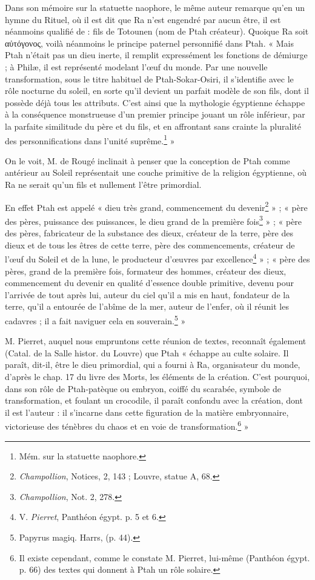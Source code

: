 \documentclass[letterpaper,twocolumn,openany,nodeprecatedcode]{dndbook}
\begin{document}
Dans son mémoire sur la statuette naophore, le même auteur remarque qu'en un hymne du Rituel, où il est dit que Ra n'est engendré par aucun être, il est néanmoins qualifié de : fils de Totounen (nom de Ptah créateur). Quoique Ra soit αὐτόγονος, voilà néanmoins le principe paternel personnifié dans Ptah. « Mais Ptah n'était pas un dieu inerte, il remplit expressément les fonctions de démiurge ; à Philæ, il est représenté modelant l'œuf du monde. Par une nouvelle transformation, sous le titre habituel de Ptah-Sokar-Osiri, il s'identifie avec le rôle nocturne du soleil, en sorte qu'il devient un parfait modèle de son fils, dont il possède déjà tous les attributs. C'est ainsi que la mythologie égyptienne échappe à la conséquence monstrueuse d'un premier principe jouant un rôle inférieur, par la parfaite similitude du père et du fils, et en affrontant sans crainte la pluralité des personnifications dans l'unité suprême.\footnote{Mém. sur la statuette naophore.} »

On le voit, M. de Rougé inclinait à penser que la conception de Ptah comme antérieur au Soleil représentait une couche primitive de la religion égyptienne, où Ra ne serait qu'un fils et nullement l'être primordial.

En effet Ptah est appelé « dieu très grand, commencement du devenir\footnote{\emph{Champollion}, Notices, 2, 143 ; Louvre, statue A, 68.} » ; « père des pères, puissance des puissances, le dieu grand de la première fois\footnote{\emph{Champollion}, Not. 2, 278.} » ; « père des pères, fabricateur de la substance des dieux, créateur de la terre, père des dieux et de tous les êtres de cette terre, père des commencements, créateur de l'œuf du Soleil et de la lune, le producteur d'œuvres par excellence\footnote{V. \emph{Pierret}, Panthéon égypt. p. 5 et 6.} » ; « père des pères, grand de la première fois, formateur des hommes, créateur des dieux, commencement du devenir en qualité d'essence double primitive, devenu pour l'arrivée de tout après lui, auteur du ciel qu'il a mis en haut, fondateur de la terre, qu'il a entourée de l'abîme de la mer, auteur de l'enfer, où il réunit les cadavres ; il a fait naviguer cela en souverain.\footnote{Papyrus magiq. Harrs, (p. 44).} »

M. Pierret, auquel nous empruntons cette réunion de textes, reconnaît également (Catal. de la Salle histor. du Louvre) que Ptah « échappe au culte solaire. Il paraît, dit-il, être le dieu primordial, qui a fourni à Ra, organisateur du monde, d'après le chap. 17 du livre des Morts, les éléments de la création. C'est pourquoi, dans son rôle de Ptah-patèque ou embryon, coiffé du scarabée, symbole de transformation, et foulant un crocodile, il paraît confondu avec la création, dont il est l'auteur : il s'incarne dans cette figuration de la matière embryonnaire, victorieuse des ténèbres du chaos et en voie de transformation.\footnote{Il existe cependant, comme le constate M. Pierret, lui-même (Panthéon égypt. p. 66) des textes qui donnent à Ptah un rôle solaire.} »
\end{document}
